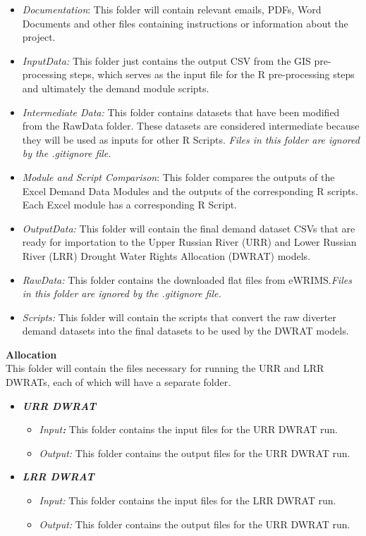 \documentclass[
]{article}
\providecommand{\tightlist}{%
  \setlength{\itemsep}{0pt}\setlength{\parskip}{0pt}}
\begin{document}
\begin{itemize}
\item
  \emph{Documentation}: This folder will contain relevant emails, PDFs,
  Word Documents and other files containing instructions or information
  about the project.
\item
  \emph{InputData:} This folder just contains the output CSV from the
  GIS pre-processing steps, which serves as the input file for the R
  pre-processing steps and ultimately the demand module scripts.
\item
  \emph{Intermediate Data:} This folder contains datasets that have been
  modified from the RawData folder. These datasets are considered
  intermediate because they will be used as inputs for other R Scripts.
  \emph{Files in this folder are ignored by the .gitignore file.}
\item
  \emph{Module and Script Comparison}: This folder compares the outputs
  of the Excel Demand Data Modules and the outputs of the corresponding
  R scripts. Each Excel module has a corresponding R Script.
\item
  \emph{OutputData:} This folder will contain the final demand dataset
  CSVs that are ready for importation to the Upper Russian River (URR)
  and Lower Russian River (LRR) Drought Water Rights Allocation (DWRAT)
  models.
\item
  \emph{RawData:} This folder contains the downloaded flat files from
  eWRIMS.\emph{Files in this folder are ignored by the .gitignore file.}
\item
  \emph{Scripts:} This folder will contain the scripts that convert the
  raw diverter demand datasets into the final datasets to be used by the
  DWRAT models.
\end{itemize}

\textbf{Allocation}\\
This folder will contain the files necessary for running the URR and LRR
DWRATs, each of which will have a separate folder.

\begin{itemize}
\tightlist
\item
  \textbf{\emph{URR DWRAT}}

  \begin{itemize}
  \tightlist
  \item
    \emph{Input\textbf{:}} This folder contains the input files for the
    URR DWRAT run.
  \item
    \emph{Output:} This folder contains the output files for the URR
    DWRAT run.
  \end{itemize}
\item
  \textbf{\emph{LRR DWRAT}}

  \begin{itemize}
  \tightlist
  \item
    \emph{Input:} This folder contains the input files for the LRR DWRAT
    run.
  \item
    \emph{Output:} This folder contains the output files for the URR
    DWRAT run.
  \end{itemize}
\end{itemize}
\end{document}
